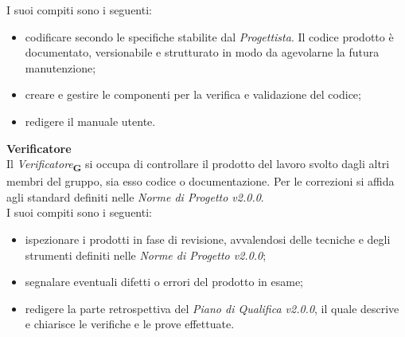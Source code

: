 I suoi compiti sono i seguenti:
\begin{itemize}
    \item codificare secondo le specifiche stabilite dal \textit{Progettista}. Il codice prodotto è documentato, versionabile e strutturato in modo da agevolarne la futura manutenzione;
    \item creare e gestire le componenti per la verifica e validazione del codice;
    \item redigere il manuale utente.
\end{itemize}
\textbf{Verificatore}\\
Il \textit{Verificatore}\textsubscript{\textbf{G}} si occupa di controllare il prodotto del lavoro svolto dagli altri membri del gruppo, sia esso codice o documentazione. Per le correzioni si affida agli standard definiti nelle \textit{Norme di Progetto v2.0.0}.\\
I suoi compiti sono i seguenti:
\begin{itemize}
    \item ispezionare i prodotti in fase di revisione, avvalendosi delle tecniche e degli strumenti definiti nelle \textit{Norme di Progetto v2.0.0};
    \item segnalare eventuali difetti o errori del prodotto in esame;
    \item redigere la parte retrospettiva del \textit{Piano di Qualifica v2.0.0}, il quale descrive e chiarisce le verifiche e le prove effettuate.
\end{itemize}

